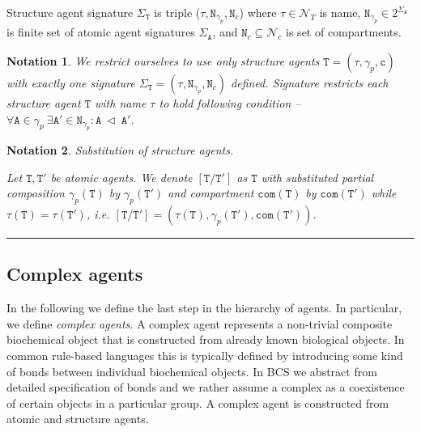 \documentclass{elsarticle}
\newtheorem{notation}{Notation}
\begin{document}
\begin{definition}
Structure agent signature $\Sigma_\mathtt{T}$ is triple ($\tau, \mathtt{N}_{\gamma_p}, \mathtt{N}_c$) where $\tau \in \mathcal{N}_{T}$ is name, $\mathtt{N}_{\gamma_p} \in 2^{\Sigma_\mathtt{A}}$ is finite set of atomic agent signatures $\Sigma_\mathtt{A}$, and $\mathtt{N}_c \subseteq \mathcal{N}_{c}$ is set of compartments.
\end{definition}

\begin{notation}
We restrict ourselves to use only structure agents $\mathtt{T} = (\tau, \gamma_p, \mathtt{c})$ with exactly one signature $\Sigma_\mathtt{T} = (\tau, \mathtt{N}_{\gamma_p}, \mathtt{N}_c)$ defined. Signature restricts each structure agent $\mathtt{T}$ with name $\tau$ to hold following condition -- $ \forall \mathtt{A} \in \gamma_p ~\exists \mathtt{A}' \in \mathtt{N}_{\gamma_p}: \mathtt{A}~\lhd~\mathtt{A}'$.
\end{notation}

\begin{notation}
\textit{Substitution of structure agents.} 

Let $\mathtt{T}, \mathtt{T}'$ be atomic agents. We denote $[\mathtt{T}/\mathtt{T}']$ as $\mathtt{T}$ with substituted partial composition $\gamma_p(\mathtt{T})$ by $\gamma_p(\mathtt{T}')$ and compartment $\mathtt{com}(\mathtt{T})$ by $\mathtt{com}(\mathtt{T'})$ while $\tau(\mathtt{T}) = \tau(\mathtt{T}')$, i.e. $[\mathtt{T}/\mathtt{T}'] = (\tau(\mathtt{T}), \gamma_p(\mathtt{T}'), \mathtt{com}(\mathtt{T}'))$.
\end{notation}

\noindent\rule{\textwidth}{1pt}


\subsection{Complex agents}

In the following we define the last step in the hierarchy of agents. In particular, we define \textit{complex agents}. A complex agent represents a non-trivial composite biochemical object that is constructed from already known biological objects. In common rule-based languages this is typically defined by introducing some kind of bonds between individual biochemical objects. In BCS we abstract from detailed specification of bonds and we rather assume a complex as a coexistence of certain objects in a particular group. A complex agent is constructed from atomic and structure agents.
\end{document}
